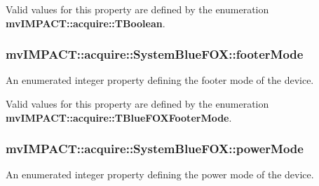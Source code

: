 Valid values for this property are defined by the enumeration {\bfseries mv\+I\+M\+P\+A\+C\+T\+::acquire\+::\+T\+Boolean}. \hypertarget{classmv_i_m_p_a_c_t_1_1acquire_1_1_system_blue_f_o_x_a871d6c6d03071605f028f0aa7b756099}{
\subsubsection[{footer\+Mode}]{ mv\+I\+M\+P\+A\+C\+T\+::acquire\+::\+System\+Blue\+F\+O\+X\+::footer\+Mode}}\label{classmv_i_m_p_a_c_t_1_1acquire_1_1_system_blue_f_o_x_a871d6c6d03071605f028f0aa7b756099}


An enumerated integer property defining the footer mode of the device. 

Valid values for this property are defined by the enumeration {\bfseries mv\+I\+M\+P\+A\+C\+T\+::acquire\+::\+T\+Blue\+F\+O\+X\+Footer\+Mode}. \hypertarget{classmv_i_m_p_a_c_t_1_1acquire_1_1_system_blue_f_o_x_a8bc3dfd608fc4c31fb6b4d7335ee0ad7}{
\subsubsection[{power\+Mode}]{ mv\+I\+M\+P\+A\+C\+T\+::acquire\+::\+System\+Blue\+F\+O\+X\+::power\+Mode}}\label{classmv_i_m_p_a_c_t_1_1acquire_1_1_system_blue_f_o_x_a8bc3dfd608fc4c31fb6b4d7335ee0ad7}


An enumerated integer property defining the power mode of the device. 

